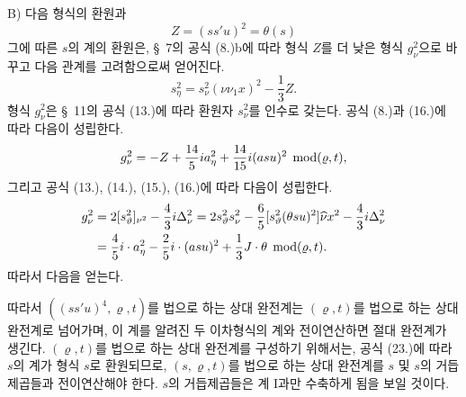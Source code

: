 
B) 다음 형식의 환원과
\[
Z=(ss'u)^2=\theta(s)
\]
그에 따른 $s$의 계의 환원은, \S\ 7의 공식 (8.)b에 따라 형식 $Z$를 더 낮은 형식 $g_\nu^2$으로 바꾸고 다음 관계를 고려함으로써 얻어진다.
\[
 s_\eta^2=s_\nu^2(\nu\nu_1x)^2-\frac13Z.
\]
형식 $g_\nu^2$은 \S\ 11의 공식 (13.)에 따라 환원자 $s_\nu^2$를 인수로 갖는다. 공식 (8.)과 (16.)에 따라 다음이 성립한다.
\[
 g_\nu^2=-Z+\frac{14}{5}ia_\eta^2+\frac{14}{15}i(asu)^2
 \;\operatorname{mod} (\varrho,t),
\]
그리고 공식 (13.), (14.), (15.), (16.)에 따라 다음이 성립한다.
\[
\begin{aligned}
g_\nu^2&=2[s_\vartheta^2]_{\nu^2}-\frac43 i\Delta_\nu^2
      =2s_\vartheta^2s_\nu^2-\frac65[s_\vartheta^2(\theta su)^2]\widehat{\nu}x^2
        -\frac43i\Delta_\nu^2\\
&=\frac45i\cdot a_\eta^2-\frac25i\cdot(asu)^2+\frac13J\cdot\theta
\;\operatorname{mod} (\varrho,t).
\end{aligned}
\]
따라서 다음을 얻는다.

따라서 $((ss'u)^4,\varrho,t)$를 법으로 하는 상대 완전계는 $(\varrho,t)$를 법으로 하는 상대 완전계로 넘어가며, 이 계를 알려진 두 이차형식의 계와 전이연산하면 절대 완전계가 생긴다. $(\varrho,t)$를 법으로 하는 상대 완전계를 구성하기 위해서는, 공식 (23.)에 따라 $s$의 계가 형식 $s$로 환원되므로, $(s,\varrho,t)$를 법으로 하는 상대 완전계를 $s$ 및 $s$의 거듭제곱들과 전이연산해야 한다. $s$의 거듭제곱들은 계 I과만 수축하게 됨을 보일 것이다.


